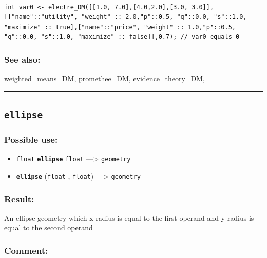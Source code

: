 \documentclass[]{book}
\providecommand{\tightlist}{%
  \setlength{\itemsep}{0pt}\setlength{\parskip}{0pt}}
\theoremstyle{definition}
\theoremstyle{definition}
\theoremstyle{definition}
\theoremstyle{remark}
\begin{document}
\begin{verbatim}
 
int var0 <- electre_DM([[1.0, 7.0],[4.0,2.0],[3.0, 3.0]], [["name"::"utility", "weight" :: 2.0,"p"::0.5, "q"::0.0, "s"::1.0, "maximize" :: true],["name"::"price", "weight" :: 1.0,"p"::0.5, "q"::0.0, "s"::1.0, "maximize" :: false]],0.7); // var0 equals 0
\end{verbatim}

\subsubsection{See also:}\label{see-also-86}

\href{operators-s-to-z.html\#weighted_means_dm}{weighted\_means\_DM},
\href{operators-n-to-r.html\#promethee_dm}{promethee\_DM},
\href{operators-d-to-h.html\#evidence_theory_dm}{evidence\_theory\_DM},

\begin{center}\rule{0.5\linewidth}{\linethickness}\end{center}

\subsection{\texorpdfstring{\texttt{ellipse}}{ellipse}}\label{ellipse}

\subsubsection{Possible use:}\label{possible-use-150}

\begin{itemize}
\tightlist
\item
  \texttt{float} \textbf{\texttt{ellipse}} \texttt{float}
  ---\textgreater{} \texttt{geometry}
\item
  \textbf{\texttt{ellipse}} (\texttt{float} , \texttt{float})
  ---\textgreater{} \texttt{geometry}
\end{itemize}

\subsubsection{Result:}\label{result-144}

An ellipse geometry which x-radius is equal to the first operand and
y-radius is equal to the second operand

\subsubsection{Comment:}\label{comment-31}
\end{document}
